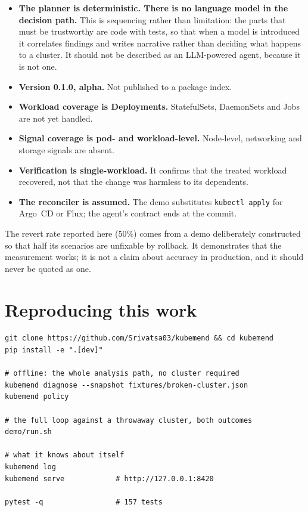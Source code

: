 \documentclass[11pt,a4paper]{article}
\newcommand{\code}[1]{\texttt{\small #1}}
\begin{document}
\begin{itemize}
  \item \textbf{The planner is deterministic. There is no language model in the decision path.} This is sequencing rather than limitation: the parts that must be trustworthy are code with tests, so that when a model is introduced it correlates findings and writes narrative rather than deciding what happens to a cluster. It should not be described as an LLM-powered agent, because it is not one.
  \item \textbf{Version 0.1.0, alpha.} Not published to a package index.
  \item \textbf{Workload coverage is Deployments.} StatefulSets, DaemonSets and Jobs are not yet handled.
  \item \textbf{Signal coverage is pod- and workload-level.} Node-level, networking and storage signals are absent.
  \item \textbf{Verification is single-workload.} It confirms that the treated workload recovered, not that the change was harmless to its dependents.
  \item \textbf{The reconciler is assumed.} The demo substitutes \code{kubectl apply} for Argo~CD or Flux; the agent's contract ends at the commit.
\end{itemize}

The revert rate reported here (50\%) comes from a demo deliberately constructed
so that half its scenarios are unfixable by rollback. It demonstrates that the
measurement works; it is not a claim about accuracy in production, and it should
never be quoted as one.

\section{Reproducing this work}

\begin{lstlisting}[caption={Requires Python 3.10+, and for the live demo, k3d, kubectl and a Docker daemon.}]
git clone https://github.com/Srivatsa03/kubemend && cd kubemend
pip install -e ".[dev]"

# offline: the whole analysis path, no cluster required
kubemend diagnose --snapshot fixtures/broken-cluster.json
kubemend policy

# the full loop against a throwaway cluster, both outcomes
demo/run.sh

# what it knows about itself
kubemend log
kubemend serve            # http://127.0.0.1:8420

pytest -q                 # 157 tests
\end{lstlisting}
\end{document}
